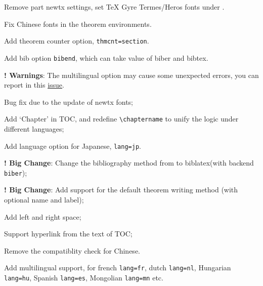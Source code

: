 \documentclass[11pt]{elegantbook}
\begin{document}

\begin{change}
  \item Remove part newtx settings, set TeX Gyre Termes/Heros fonts under .
  \item Fix Chinese fonts in the theorem environments.
  \item Add theorem counter option, \lstinline{thmcnt=section}.
  \item Add bib option \lstinline{bibend}, which can take value of biber and bibtex.
  \item \textbf{! Warnings}: The multilingual option may cause some unexpected errors, you can report in this \href{https://github.com/ElegantLaTeX/ElegantBook/issues/170}{issue}.
\end{change}




\begin{change}
  \item Bug fix due to the update of newtx fonts;
  \item Add `Chapter' in TOC, and redefine \lstinline{\chaptername} to unify the logic under different languages;
  \item Add language option for Japanese, \lstinline{lang=jp}.
\end{change}



\begin{change}
  \item \textbf{! Big Change}: Change the bibliography method from  to biblatex(with backend  \lstinline{biber});
  \item \textbf{! Big Change}: Add support for the default theorem writing method (with optional name and label);
  \item Add left and right space;
  \item Support hyperlink from the text of TOC;
  \item Remove the  compatiblity check for Chinese.
  \item Add multilingual support, for french \lstinline{lang=fr}, dutch \lstinline{lang=nl}, Hungarian  \lstinline{lang=hu}, Spanish \lstinline{lang=es}, Mongolian \lstinline{lang=mn} etc.
\end{change}

\end{document}
